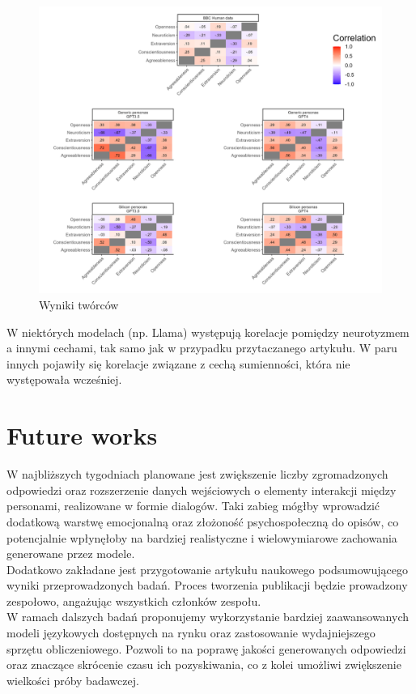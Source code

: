 \documentclass{article}
\begin{document}
\begin{figure}[H]
    \centering
    \includegraphics[width=0.7 \linewidth]{./article_data/all_corr.png}
    \caption{Wyniki twórców}
\end{figure}
W niektórych modelach (np. Llama) występują korelacje pomiędzy neurotyzmem a innymi cechami, tak samo jak w przypadku przytaczanego artykułu. W paru innych pojawiły się korelacje związane z cechą sumienności, która nie występowała wcześniej.  


\section{Future works}
W najbliższych tygodniach planowane jest zwiększenie liczby zgromadzonych odpowiedzi oraz rozszerzenie danych wejściowych o elementy interakcji między personami, realizowane w formie dialogów. 
Taki zabieg mógłby wprowadzić dodatkową warstwę emocjonalną oraz złożoność psychospołeczną do opisów, co potencjalnie wpłynęłoby na bardziej realistyczne i wielowymiarowe zachowania generowane przez modele.\\
Dodatkowo zakładane jest przygotowanie artykułu naukowego podsumowującego wyniki przeprowadzonych badań. Proces tworzenia publikacji będzie prowadzony zespołowo, angażując wszystkich członków zespołu. \\

W ramach dalszych badań proponujemy wykorzystanie bardziej zaawansowanych modeli językowych dostępnych na rynku oraz zastosowanie wydajniejszego sprzętu obliczeniowego. Pozwoli to na poprawę jakości generowanych odpowiedzi oraz znaczące skrócenie czasu ich pozyskiwania, co z kolei umożliwi zwiększenie wielkości próby badawczej.
\end{document}
